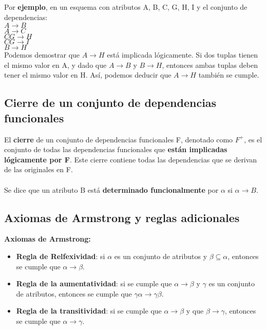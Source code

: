 \documentclass{article}
\begin{document}
Por \textbf{ejemplo}, en un esquema con atributos A, B, C, G, H, I y el conjunto de dependencias: \\
    $A\xrightarrow{}B$ \\
    $A\xrightarrow{}C$ \\
    $CG\xrightarrow{}H$ \\
    $CG\xrightarrow{}I$ \\
    $B\xrightarrow{}H$ \\

Podemos demostrar que $A\xrightarrow{}H$ está implicada lógicamente. Si dos tuplas tienen el mismo valor en A, y dado que $A\xrightarrow{}B$ y $B\xrightarrow{}H$, entonces ambas tuplas deben tener el mismo valor en H. Así, podemos deducir que $A\xrightarrow{}H$ también se cumple.

\subsection{Cierre de un conjunto de dependencias funcionales}
El \textbf{cierre} de un conjunto de dependencias funcionales F, denotado como $F^+$, es el conjunto de todas las dependencias funcionales que \textbf{están implicadas lógicamente por F}. Este cierre contiene todas las dependencias que se derivan de las originales en F. \\

\\

Se dice que un atributo B está \textbf{determinado funcionalmente} por $\alpha$ si $\alpha \xrightarrow{} B$. 

\subsection{Axiomas de Armstrong y reglas adicionales}
\textbf{Axiomas de Armstrong:}
\begin{itemize}
    \item \textbf{Regla de Relfexividad}: si $\alpha$ es un conjunto de atributos y $\beta \subseteq \alpha$, entonces se cumple que $\alpha \xrightarrow{} \beta$.
    \item \textbf{Regla de la aumentatividad}: si se cumple que $\alpha \xrightarrow{} \beta$ y $\gamma$ es un conjunto de atributos, entonces se cumple que $\gamma\alpha \xrightarrow{} \gamma\beta$.
    \item \textbf{Regla de la transitividad}: si se cumple que $\alpha \xrightarrow{} \beta$ y que $\beta \xrightarrow{} \gamma$, entonces se cumple que $\alpha \xrightarrow{} \gamma$.
\end{itemize}
\end{document}
